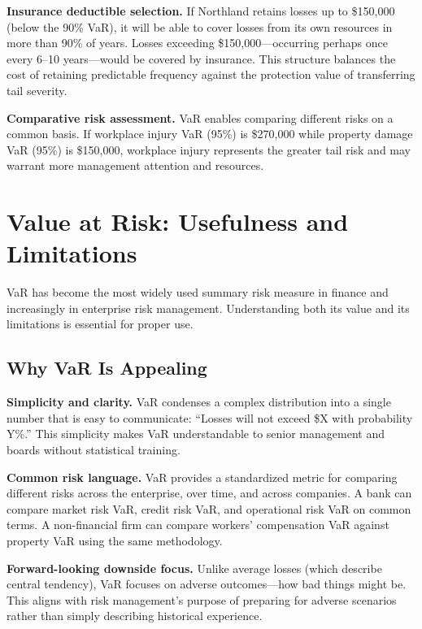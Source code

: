 \documentclass[11pt,openany]{book}
\begin{document}
\textbf{Insurance deductible selection.} If Northland retains losses up to
\$150,000 (below the 90\% VaR), it will be able to cover losses from its own
resources in more than 90\% of years. Losses exceeding \$150,000---occurring
perhaps once every 6--10 years---would be covered by insurance. This structure
balances the cost of retaining predictable frequency against the protection
value of transferring tail severity.

\textbf{Comparative risk assessment.} VaR enables comparing different risks on
a common basis. If workplace injury VaR (95\%) is \$270,000 while property
damage VaR (95\%) is \$150,000, workplace injury represents the greater tail
risk and may warrant more management attention and resources.

\section{Value at Risk: Usefulness and Limitations}
\label{sec:var-limitations}

VaR has become the most widely used summary risk measure in finance and
increasingly in enterprise risk management. Understanding both its value and
its limitations is essential for proper use.

\subsection{Why VaR Is Appealing}
\label{subsec:var-appeal}

\textbf{Simplicity and clarity.} VaR condenses a complex distribution into a
single number that is easy to communicate: ``Losses will not exceed \$X with
probability Y\%.'' This simplicity makes VaR understandable to senior
management and boards without statistical training.

\textbf{Common risk language.} VaR provides a standardized metric for
comparing different risks across the enterprise, over time, and across
companies. A bank can compare market risk VaR, credit risk VaR, and operational
risk VaR on common terms. A non-financial firm can compare workers' compensation
VaR against property VaR using the same methodology.

\textbf{Forward-looking downside focus.} Unlike average losses (which describe
central tendency), VaR focuses on adverse outcomes---how bad things might be.
This aligns with risk management's purpose of preparing for adverse scenarios
rather than simply describing historical experience.
\end{document}

